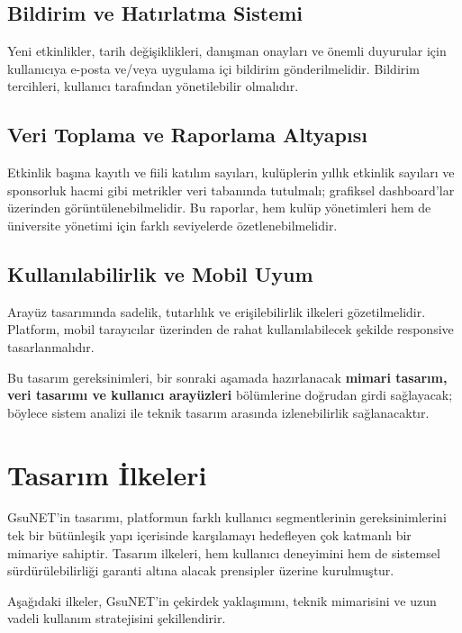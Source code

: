 \documentclass[a4paper,12pt]{report}
\begin{document}
\subsection{Bildirim ve Hatırlatma Sistemi}

Yeni etkinlikler, tarih değişiklikleri, danışman onayları ve önemli duyurular için kullanıcıya e-posta ve/veya uygulama içi bildirim gönderilmelidir. Bildirim tercihleri, kullanıcı tarafından yönetilebilir olmalıdır.

\subsection{Veri Toplama ve Raporlama Altyapısı}

Etkinlik başına kayıtlı ve fiili katılım sayıları, kulüplerin yıllık etkinlik sayıları ve sponsorluk hacmi gibi metrikler veri tabanında tutulmalı; grafiksel dashboard'lar üzerinden görüntülenebilmelidir. Bu raporlar, hem kulüp yönetimleri hem de üniversite yönetimi için farklı seviyelerde özetlenebilmelidir.

\subsection{Kullanılabilirlik ve Mobil Uyum}

Arayüz tasarımında sadelik, tutarlılık ve erişilebilirlik ilkeleri gözetilmelidir. Platform, mobil tarayıcılar üzerinden de rahat kullanılabilecek şekilde responsive tasarlanmalıdır.

\bigskip

Bu tasarım gereksinimleri, bir sonraki aşamada hazırlanacak \textbf{mimari tasarım, veri tasarımı ve kullanıcı arayüzleri} bölümlerine doğrudan girdi sağlayacak; böylece sistem analizi ile teknik tasarım arasında izlenebilirlik sağlanacaktır.

\section{Tasarım İlkeleri}

GsuNET’in tasarımı, platformun farklı kullanıcı segmentlerinin gereksinimlerini tek bir bütünleşik yapı içerisinde karşılamayı hedefleyen çok katmanlı bir mimariye sahiptir. Tasarım ilkeleri, hem kullanıcı deneyimini hem de sistemsel sürdürülebilirliği garanti altına alacak prensipler üzerine kurulmuştur.

Aşağıdaki ilkeler, GsuNET’in çekirdek yaklaşımını, teknik mimarisini ve uzun vadeli kullanım stratejisini şekillendirir.
\end{document}

